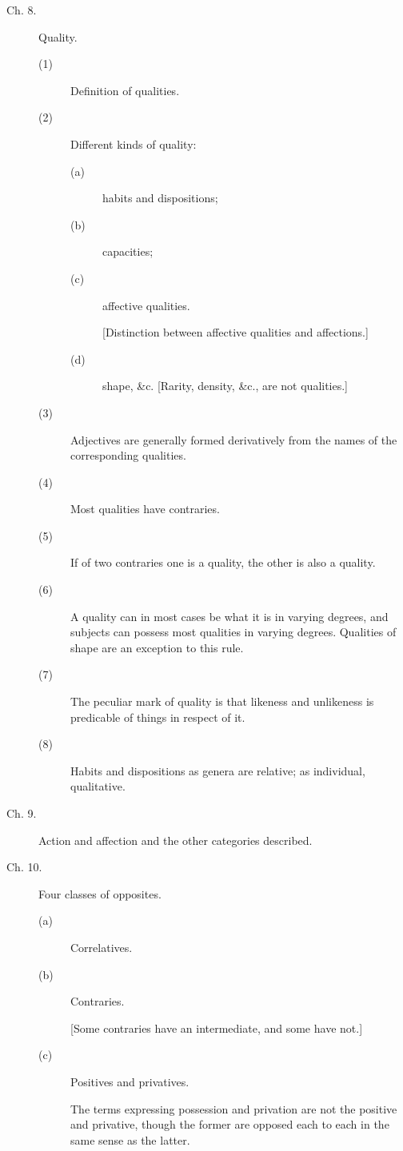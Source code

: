 \begin{description}
\item[Ch. 8.] Quality.
\begin{description}
\item[(1)] Definition of qualities. 
\item[(2)] Different kinds of quality:
\begin{description}
\item[(a)] habits and dispositions; 
\item[(b)] capacities;
\item[(c)] affective qualities.

[Distinction between affective qualities and affections.] 
\item[(d)] shape, {\&}c. [Rarity, density, {\&}c., are not qualities.]
\end{description}
\item[(3)] Adjectives are generally formed derivatively from the names of the corresponding qualities. 
\item[(4)] Most qualities have contraries. 
\item[(5)] If of two contraries one is a quality, the other is also a quality. 
\item[(6)] A quality can in most cases be what it is in varying degrees, and subjects can possess most qualities in varying degrees.
Qualities of shape are an exception to this rule. 
\item[(7)] The peculiar mark of quality is that likeness and unlikeness is predicable of things in respect of it. 
\item[(8)] Habits and dispositions as genera are relative; as individual, qualitative. 
\end{description}

\item[Ch. 9.] Action and affection and the other categories described. 

\item[Ch. 10.] Four classes of opposites.
\begin{description}
\item[(a)] Correlatives. 
\item[(b)] Contraries.

[Some contraries have an intermediate, and some have not.] 
\item[(c)] Positives and privatives. 

The terms expressing possession and privation are not the positive 
and privative, though the former are opposed each to each in the same 
sense as the latter. 


\end{description}
\end{description}
